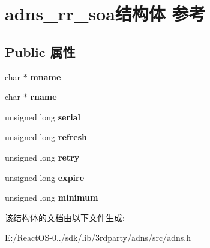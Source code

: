\hypertarget{structadns__rr__soa}{}\section{adns\+\_\+rr\+\_\+soa结构体 参考}
\label{structadns__rr__soa}
\subsection*{Public 属性}
\begin{DoxyCompactItemize}
\item 
\mbox{\label{structadns__rr__soa_ad2c764d932c724397116929343bb7329}} 
char $\ast$ {\bfseries mname}
\item 
\mbox{\label{structadns__rr__soa_a8f6ff499a700235664d0856e929d6b0f}} 
char $\ast$ {\bfseries rname}
\item 
\mbox{\label{structadns__rr__soa_a3e21348924a61b1937b89c65ef4628ff}} 
unsigned long {\bfseries serial}
\item 
\mbox{\label{structadns__rr__soa_a0641970536c6456fe980ea376e20b065}} 
unsigned long {\bfseries refresh}
\item 
\mbox{\label{structadns__rr__soa_a1820687601ee684e5d1c262137f491c6}} 
unsigned long {\bfseries retry}
\item 
\mbox{\label{structadns__rr__soa_a2e51e00e038d35db28dcb1dc102e79ca}} 
unsigned long {\bfseries expire}
\item 
\mbox{\label{structadns__rr__soa_af178986556debb13f32fafcfaa74cdeb}} 
unsigned long {\bfseries minimum}
\end{DoxyCompactItemize}


该结构体的文档由以下文件生成\+:\begin{DoxyCompactItemize}
\item 
E\+:/\+React\+O\+S-\/0../sdk/lib/3rdparty/adns/src/adns.\+h\end{DoxyCompactItemize}

